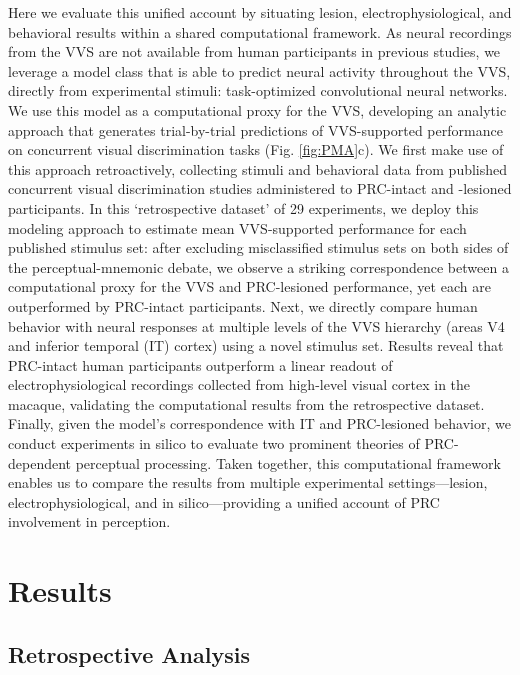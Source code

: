 \documentclass[11pt]{article}
\begin{document}
Here we evaluate this unified account by situating lesion, electrophysiological, and behavioral results within a shared computational framework. As neural recordings from the VVS are not available from human participants in previous studies, we leverage a model class that is able to predict neural activity throughout the VVS, directly from experimental stimuli: task-optimized convolutional neural networks\cite{cadena2019deep, bashivan2019neural, yamins2014performance}. We use this model as a computational proxy for the VVS, developing an analytic approach that generates trial-by-trial predictions of VVS-supported performance on concurrent visual discrimination tasks (Fig. \ref{fig:PMA}c). We first make use of this approach retroactively, collecting stimuli and behavioral data from published concurrent visual discrimination studies administered to PRC-intact and -lesioned participants. In this `retrospective dataset' of 29 experiments, we deploy this modeling approach to estimate mean VVS-supported performance for each published stimulus set: after excluding misclassified stimulus sets on both sides of the perceptual-mnemonic debate, we observe a striking correspondence between a computational proxy for the VVS and PRC-lesioned performance, yet each are outperformed by PRC-intact participants. Next, we directly compare human behavior with neural responses at multiple levels of the VVS hierarchy (areas V4 and inferior temporal (IT) cortex) using a novel stimulus set. Results reveal that PRC-intact human participants outperform a linear readout of electrophysiological recordings collected from high-level visual cortex in the macaque, validating the computational results from the retrospective dataset. Finally, given the model's correspondence with IT and PRC-lesioned behavior, we conduct experiments in silico to evaluate two prominent theories of PRC-dependent perceptual processing. Taken together, this computational framework enables us to compare the results from multiple experimental settings---lesion, electrophysiological, and in silico---providing a unified account of PRC involvement in perception.  

\section{Results}

\subsection{Retrospective Analysis}
\end{document}
